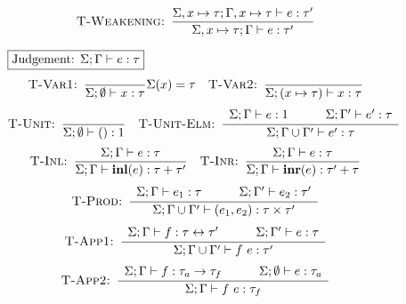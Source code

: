 \begin{align*}
  \textsc{T-Weakening: }
    \dfrac
      {\Sigma, x \mapsto \tau; \Gamma, x \mapsto \tau \vdash e : \tau'}
      {\Sigma, x \mapsto \tau; \Gamma \vdash e : \tau'}
\end{align*}

\begin{figure}[t!]

\setlength\fboxsep{0.15cm}
\noindent$\boxed{\text{Judgement: } \Sigma;\Gamma\vdash e : \tau}$
\begin{align*}
  \textsc{T-Var1: }
    \dfrac
      {}
      {\Sigma;\emptyset\vdash x : \tau} \Sigma(x) = \tau &&
  \textsc{T-Var2: }
    \dfrac
      {}
      {\Sigma; (x \mapsto \tau) \vdash x : \tau}
\end{align*}
\alignspace
\begin{align*}
  \textsc{T-Unit: }
    \dfrac
      {}
      {\Sigma;\emptyset\vdash () : 1} &&
  \textsc{T-Unit-Elm: }
    \dfrac
      {\begin{array}{ccc}
       \Sigma;\Gamma\vdash e : 1 & \quad &
       \Sigma;\Gamma'\vdash e' : \tau
       \end{array}}
      {\Sigma;\Gamma\cup\Gamma'\vdash e' : \tau}
\end{align*}
\alignspace
\begin{align*}
  \textsc{T-Inl: }
    \dfrac
      {\Sigma;\Gamma\vdash e : \tau}
      {\Sigma;\Gamma\vdash \textbf{inl}(e) : \tau + \tau'} &&
  \textsc{T-Inr: }
    \dfrac
      {\Sigma;\Gamma\vdash e : \tau}
      {\Sigma;\Gamma\vdash \textbf{inr}(e) : \tau' + \tau}
\end{align*}
\alignspace
\begin{align*}
  \textsc{T-Prod: }
    \dfrac
      {\begin{array}{ccc}
       \Sigma;\Gamma\vdash e_1 : \tau & \quad &
       \Sigma;\Gamma'\vdash e_2 : \tau'
       \end{array}}
      {\Sigma;\Gamma\cup\Gamma'\vdash (e_1, e_2) : \tau \times \tau'}
\end{align*}
\alignspace
\begin{align*}
  \textsc{T-App1: }
    \dfrac
      {\begin{array}{ccc}
       \Sigma;\Gamma\vdash f : \tau \leftrightarrow \tau' & \quad &
       \Sigma;\Gamma'\vdash e : \tau
       \end{array}}
      {\Sigma;\Gamma\cup\Gamma'\vdash f~e : \tau'}
\end{align*}
\alignspace
\begin{align*}
  \textsc{T-App2: }
    \dfrac
      {\begin{array}{ccc}
       \Sigma;\Gamma\vdash f : \tau_a \rightarrow \tau_f & \quad &
       \Sigma;\emptyset\vdash e : \tau_a
       \end{array}}
      {\Sigma;\Gamma\vdash f~e : \tau_f}
\end{align*}

\end{figure}
